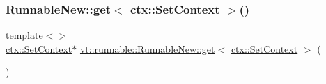 \mbox{\label{namespacevt_1_1runnable_afec92e402b96766d18a24246651015f3}} 
\subsubsection{\texorpdfstring{Runnable\+New\+::get$<$ ctx\+::\+Set\+Context $>$()}{RunnableNew::get< ctx::SetContext >()}}
{\footnotesize\ttfamily template$<$$>$ \\
\hyperlink{structvt_1_1ctx_1_1_set_context}{ctx\+::\+Set\+Context}$\ast$ \hyperlink{structvt_1_1runnable_1_1_runnable_new_a140176f3b035d504ad1e726e3c7b09fa}{vt\+::runnable\+::\+Runnable\+New\+::get}$<$ \hyperlink{structvt_1_1ctx_1_1_set_context}{ctx\+::\+Set\+Context} $>$ (\begin{DoxyParamCaption}{ }\end{DoxyParamCaption})\hspace{0.3cm}{\ttfamily [inline]}}


